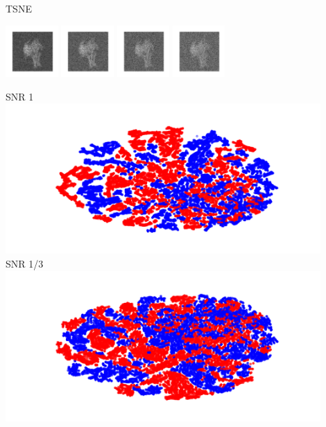 \documentclass[t, 11pt, xcolor=dvipsnames]{beamer}
\begin{document}
\begin{frame}[fragile]{TSNE} 
	\begin{center}
          \vspace{-1em}
            \includegraphics[width=0.15\textwidth]{images/projSNR1.png}
            \includegraphics[width=0.15\textwidth]{images/projSNR1_2.png}
            \includegraphics[width=0.15\textwidth]{images/projSNR1_3.png}
            \includegraphics[width=0.15\textwidth]{images/projSNR1_4.png}
		  \begin{minipage}{0.47\textwidth}
	          SNR 1\\
                  \includegraphics[width=0.9\textwidth]{images/dimredcomps/TSNE_gt_snr1.png}\\
		  SNR 1/3\\
                  \includegraphics[width=0.9\textwidth]{images/dimredcomps/TSNE_gt_snr1_3.png}\\

\end{minipage}
\end{center}
\end{frame}
\end{document}
